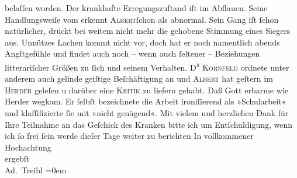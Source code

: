 \begin{ledgroupsized}[t]{13cm}
                    belaſſen worden. Der krankhafte Erregungszuſtand iſt im Abflauen. Seine
                    Handlungsweiſe vom \label{K_L01575_1v}\label{K_L01575_1h} erkennt \textsc{Albert}ſchon als abnormal. Sein Gang iſt ſchon
                    natürlicher, drückt bei weitem nicht mehr die gehobene Stimmung eines Siegers
                    aus. Unnützes {\pb}Lachen kommt nicht vor, doch hat
                    er noch namentlich abends Angſtgefühle und findet auch noch – wenn auch ſeltener
                    – Beziehungen litterariſcher Größen zu ſich und seinem Verhalten.\pend
           \pstart
           \textsc{D\textsuperscript{r}}{ }\textsc{Kornfeld} ordnete unter anderem auch gelinde geiſtige Beſchäftigung an und \textsc{Albert} hat geſtern im \textsc{Herder} geleſen u darüber eine \textsc{Kritik} zu liefern gehabt.
                    Daß Gott erbarme wie Herder wegkam. Er ſelbſt
                        be{\pb}zeichnete die Arbeit ironiſierend als
                    »Schularbeit« und klaſſifizierte ſie mit »nicht genügend«.\pend
           \pstart
           Mit vielem und herzlichen Dank für Ihre Teilnahme an das Geſchick des Kranken bitte ich um
                    Entſchuldigung, wenn ich ſo frei ſein werde dieſer Tage weiter zu berichten \pend
           \pstart
           In vollkommener Hochachtung{\\[\baselineskip]}ergebſt{\\[\baselineskip]}\spacefill\mbox{Ad. Treibl}\pend
           \leftskip=0em{}\endnumbering{}\end{ledgroupsized}  \newcommand{\dateiname}{L01575}\newcommand{\titel}{Adolf Treibl an Arthur Schnitzler, [22.? 1. 1906]}\newcommand{\editorInnen}{Martin Anton Müller und Gerd-Hermann Susen}
      